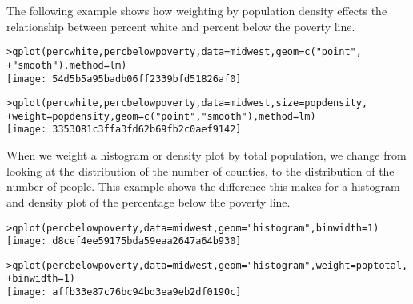 The following example shows how weighting by population density effects the relationship between percent white and percent below the poverty line.

\begin{alltt}
> qplot(percwhite, percbelowpoverty, data = midwest, geom = c("point", 
+     "smooth"), method = lm)
\texttt{[image: 54d5b5a95badb06ff2339bfd51826af0]}

> qplot(percwhite, percbelowpoverty, data = midwest, size = popdensity, 
+     weight = popdensity, geom = c("point", "smooth"), method = lm)
\texttt{[image: 3353081c3ffa3fd62b69fb2c0aef9142]}

\end{alltt}

When we weight a histogram or density plot by total population, we change from looking at the distribution of the number of counties, to the distribution of the number of people.  This example shows the difference this makes for a histogram and density plot of the percentage below the poverty line.

\begin{alltt}
> qplot(percbelowpoverty, data = midwest, geom = "histogram", binwidth = 1)
\texttt{[image: d8cef4ee59175bda59eaa2647a64b930]}

> qplot(percbelowpoverty, data = midwest, geom = "histogram", weight = poptotal, 
+     binwidth = 1)
\texttt{[image: affb33e87c76bc94bd3ea9eb2df0190c]}

\end{alltt}


